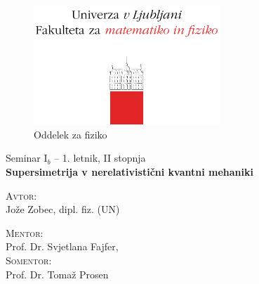 \begin{titlepage}
	\begin{figure}[H]
		\centering
		\includegraphics[width = 7cm, keepaspectratio=1]{pics/logo.pdf}\\[12pt]
		{\sc Oddelek za fiziko}\\[4cm]
	\end{figure}
	\begin{center}
		\large{Seminar I$_b$ -- 1. letnik, II stopnja}\\[0.5cm]
		\LARGE\textbf{Supersimetrija v nerelativisti\v cni kvantni mehaniki}\\[1.0cm]

		\vspace{0.0cm}

		\begin{minipage}{0.4\textwidth}\small
			\begin{flushleft}
			\textsc{Avtor:}\\[0.2cm]
			Jo\v ze Zobec, dipl. fiz. (UN)
			\end{flushleft}
		\end{minipage}
		\begin{minipage}{0.4\textwidth}\small
			\begin{flushright}
				\textsc{Mentor:}\\[0.2cm]
				Prof. Dr. Svjetlana Fajfer,\\[0.5cm]
				\textsc{Somentor:}\\[0.1cm]
				Prof. Dr. Toma\v z Prosen
			\end{flushright}
		\end{minipage}
	\end{center}

	\vspace{3.5cm}

	\begin{abstract}
		Supersimetrija je \v sir\v se podro\v cje, ki ni omejeno zgolj na fiziko osnovnih
		delcev, pa\v c pa lahko najde rabo tudi drugod v fiziki. V tem seminarju bom pokazal
		ra\v cunske prijeme v obravnavi \v solskih kvantno-mehanskih problemov s pomo\v cjo
		supersimetri\v cnega ogrodja in novosti v teoriji izospektralnih Hamiltonianov ter
		teoriji perturbacij.
	\end{abstract}
	
	\vfill

\end{titlepage}


